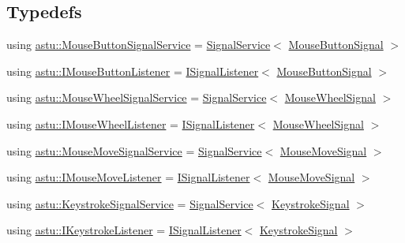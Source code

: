 \subsection*{Typedefs}
\begin{DoxyCompactItemize}
\item 
using \hyperlink{group__input__group_gaef177cf232be6c7241aa5666eda79fe2}{astu\+::\+Mouse\+Button\+Signal\+Service} = \hyperlink{classastu_1_1SignalService}{Signal\+Service}$<$ \hyperlink{classastu_1_1MouseButtonSignal}{Mouse\+Button\+Signal} $>$
\item 
using \hyperlink{group__input__group_ga8a311a2e19975ce6dca1696de117bd61}{astu\+::\+I\+Mouse\+Button\+Listener} = \hyperlink{classastu_1_1ISignalListener}{I\+Signal\+Listener}$<$ \hyperlink{classastu_1_1MouseButtonSignal}{Mouse\+Button\+Signal} $>$
\item 
using \hyperlink{group__input__group_ga96b8db1f382f5583478ba36333545c44}{astu\+::\+Mouse\+Wheel\+Signal\+Service} = \hyperlink{classastu_1_1SignalService}{Signal\+Service}$<$ \hyperlink{classastu_1_1MouseWheelSignal}{Mouse\+Wheel\+Signal} $>$
\item 
using \hyperlink{group__input__group_gafca8f2a610ab238ce3601915b0ece9b6}{astu\+::\+I\+Mouse\+Wheel\+Listener} = \hyperlink{classastu_1_1ISignalListener}{I\+Signal\+Listener}$<$ \hyperlink{classastu_1_1MouseWheelSignal}{Mouse\+Wheel\+Signal} $>$
\item 
using \hyperlink{group__input__group_ga030aa8acde5d1cbd13faeb15e487adaf}{astu\+::\+Mouse\+Move\+Signal\+Service} = \hyperlink{classastu_1_1SignalService}{Signal\+Service}$<$ \hyperlink{classastu_1_1MouseMoveSignal}{Mouse\+Move\+Signal} $>$
\item 
using \hyperlink{group__input__group_gac96f23d186368c518ef6ad649a49204d}{astu\+::\+I\+Mouse\+Move\+Listener} = \hyperlink{classastu_1_1ISignalListener}{I\+Signal\+Listener}$<$ \hyperlink{classastu_1_1MouseMoveSignal}{Mouse\+Move\+Signal} $>$
\item 
using \hyperlink{group__input__group_gaef1a6a6bcf29be13022699bae86ab903}{astu\+::\+Keystroke\+Signal\+Service} = \hyperlink{classastu_1_1SignalService}{Signal\+Service}$<$ \hyperlink{classastu_1_1KeystrokeSignal}{Keystroke\+Signal} $>$
\item 
using \hyperlink{group__input__group_ga7eab1e88bb924ed418fa54cb663031e3}{astu\+::\+I\+Keystroke\+Listener} = \hyperlink{classastu_1_1ISignalListener}{I\+Signal\+Listener}$<$ \hyperlink{classastu_1_1KeystrokeSignal}{Keystroke\+Signal} $>$
\item 

\end{DoxyCompactItemize}
